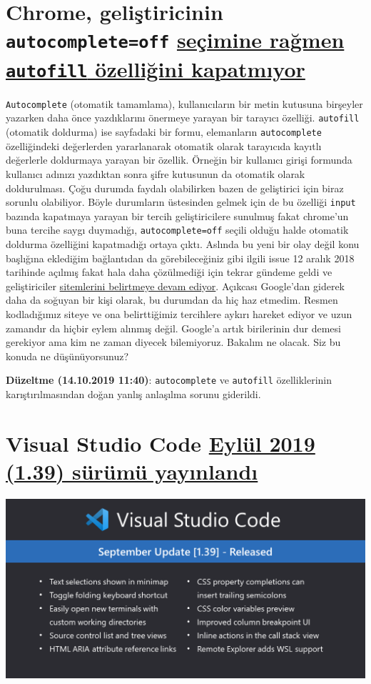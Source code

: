 \documentclass[11pt]{article}
\begin{document}
\section{Chrome, geliştiricinin \texttt{autocomplete=off} \href{https://bugs.chromium.org/p/chromium/issues/detail?id=914451\#c73}{seçimine rağmen \texttt{autofill} özelliğini kapatmıyor}}
\label{sec:org6354061}
\texttt{Autocomplete} (otomatik tamamlama), kullanıcıların bir metin kutusuna
birşeyler yazarken daha önce yazdıklarını önermeye yarayan bir tarayıcı
özelliği. \texttt{autofill} (otomatik doldurma) ise sayfadaki bir formu, elemanların
\texttt{autocomplete} özelliğindeki değerlerden yararlanarak otomatik olarak
tarayıcıda kayıtlı değerlerle doldurmaya yarayan bir özellik. Örneğin bir
kullanıcı girişi formunda kullanıcı adınızı yazdıktan sonra şifre kutusunun da
otomatik olarak doldurulması. Çoğu durumda faydalı olabilirken bazen de
geliştirici için biraz sorunlu olabiliyor. Böyle durumların üstesinden gelmek
için de bu özelliği \texttt{input} bazında kapatmaya yarayan bir tercih
geliştiricilere sunulmuş fakat chrome'un buna tercihe saygı duymadığı,
\texttt{autocomplete=off} seçili olduğu halde otomatik doldurma özelliğini kapatmadığı
ortaya çıktı. Aslında bu yeni bir olay değil konu başlığına eklediğim
bağlantıdan da görebileceğiniz gibi ilgili issue 12 aralık 2018 tarihinde
açılmış fakat hala daha çözülmediği için tekrar gündeme geldi ve geliştiriciler
\href{https://www.reddit.com/r/programming/comments/dhd3av/issue\_914451\_autofill\_does\_not\_respect/}{sitemlerini belirtmeye devam ediyor}. Açıkcası Google'dan giderek daha da
soğuyan bir kişi olarak, bu durumdan da hiç haz etmedim. Resmen kodladığımız
siteye ve ona belirttiğimiz tercihlere aykırı hareket ediyor ve uzun zamandır
da hiçbir eylem alınmış değil. Google'a artık birilerinin dur demesi gerekiyor
ama kim ne zaman diyecek bilemiyoruz. Bakalım ne olacak. Siz bu konuda ne
düşünüyorsunuz?

\textbf{Düzeltme (14.10.2019 11:40)}: \texttt{autocomplete} ve \texttt{autofill} özelliklerinin
karıştırılmasından doğan yanlış anlaşılma sorunu giderildi.
\section{Visual Studio Code \href{https://code.visualstudio.com/updates/v1\_39}{Eylül 2019 (1.39) sürümü yayınlandı}}
\label{sec:orgeba1d8e}
\begin{center}
\includegraphics[width=.9\linewidth]{gorseller/vscode1-39.png}
\end{center}
\end{document}
